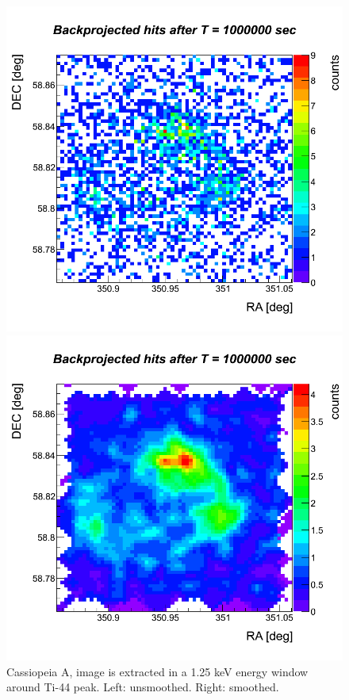 \begin{figure}[ht]
  \begin{minipage}[c]{0.48\linewidth}
    \begin{center}
      \includegraphics[scale=0.3]{CasA/CasA_It2b_B6_Smooth0.png}  
    \end{center}
  \end{minipage}
  \hspace{0.04\linewidth}
  \begin{minipage}[c]{0.48\linewidth}
    \begin{center}
      \includegraphics[scale=0.3]{CasA/CasA_It2b_B6_Smooth2.png}  
    \end{center}
  \end{minipage}
  \caption{Cassiopeia A, image is extracted in a 1.25 keV energy window around Ti-44 peak. Left: unsmoothed. Right: smoothed.}
\end{figure}

